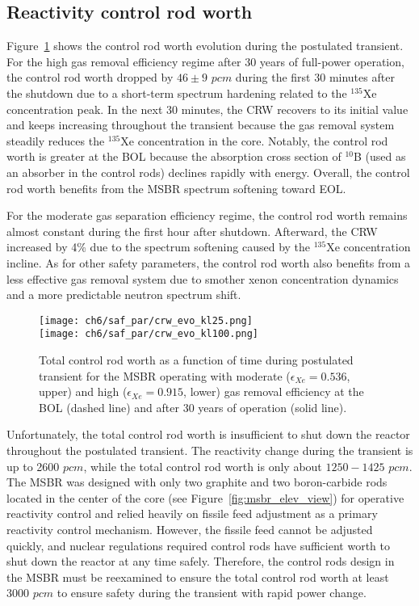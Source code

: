 \subsection{Reactivity control rod worth}
Figure~\ref{fig:lf-msbr-crw-evo} shows the control rod worth evolution 
during the postulated transient. For the high gas removal efficiency regime 
after 30 years of full-power operation, the control rod worth dropped by 
$46\pm9$ $pcm$ during the first 30 minutes after the shutdown due to a 
short-term spectrum hardening related to the $^{135}$Xe concentration peak. In 
the next 30 minutes, the CRW recovers to its initial value and keeps 
increasing throughout the transient because the gas removal system steadily 
reduces the $^{135}$Xe concentration in the core. Notably, the control rod 
worth is greater at the \gls{BOL} because the absorption cross section of 
$^{10}$B (used as an absorber in the control rods) declines rapidly with 
energy. Overall, the control rod worth benefits from the \gls{MSBR} spectrum 
softening toward \gls{EOL}.

For the moderate gas separation efficiency regime, the control rod worth 
remains almost constant during the first hour after shutdown. Afterward, the 
CRW increased by 4\% due to the spectrum softening caused by the $^{135}$Xe 
concentration incline. As for other safety parameters, the control rod worth 
also benefits from a less effective gas removal system due to smother xenon 
concentration dynamics and a more predictable neutron spectrum shift. 
\begin{figure}[htbp!] %
	\centering
	\texttt{[image: ch6/saf\_par/crw\_evo\_kl25.png]}\\
	\vspace{-10mm}
	\hspace{+0.05mm}
	\texttt{[image: ch6/saf\_par/crw\_evo\_kl100.png]}
	\vspace{-3mm}
	\caption{Total control rod worth as a function of time during 
		postulated transient
for the \gls{MSBR} operating with moderate 
		($\epsilon_{Xe}=0.536$, upper) and high ($\epsilon_{Xe}=0.915$, lower) 
		gas removal efficiency at the \gls{BOL} (dashed line) and after 30 
		years of operation (solid line).}
	\label{fig:lf-msbr-crw-evo}
\end{figure}

Unfortunately, the total control rod worth is insufficient to shut down the 
reactor throughout the postulated transient. The reactivity change during the 
transient is up to 2600 $pcm$, while the total control rod worth is only about 
$1250-1425$ $pcm$. The \gls{MSBR} was designed with only two graphite and two 
boron-carbide rods located in the center of the core (see 
Figure~\ref{fig:msbr_elev_view}) for operative reactivity control and relied 
heavily on fissile feed adjustment as a primary reactivity control 
mechanism. However, the fissile feed cannot be adjusted quickly, and nuclear  
regulations required control rods have sufficient worth to shut down the 
reactor at any time safely. Therefore, the control rods design in the 
\gls{MSBR} must be reexamined to ensure the total control rod worth at least 
3000 $pcm$ to ensure safety during the transient with rapid power change.


